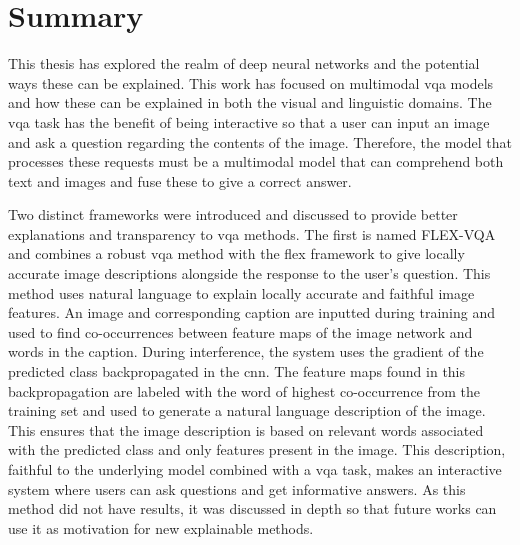 \section{Summary}
\label{sec:5_1_summary}
\begin{comment}
    Briefly summarize what you have done more or less in a step-by-step manner.
    
    Here you summarize and conclude the thesis, and it contains a lot of repetitions from previous chapters. Often, it has been structured in the following three sections, but sometimes they are also merged (especially the first two).
\end{comment}

This thesis has explored the realm of deep neural networks and the potential ways these can be explained. 
This work has focused on multimodal \gls{vqa} models and how these can be explained in both the visual and linguistic domains.
The \gls{vqa} task has the benefit of being interactive so that a user can input an image and ask a question regarding the contents of the image. Therefore, the model that processes these requests must be a multimodal model that can comprehend both text and images and fuse these to give a correct answer. 


    Two distinct frameworks were introduced and discussed to provide better explanations and transparency to \gls{vqa} methods.
    The first is named FLEX-VQA and combines a robust \gls{vqa} method with the \gls{flex} framework to give locally accurate image descriptions alongside the response to the user's question. 
    This method uses natural language to explain locally accurate and faithful image features.
    An image and corresponding caption are inputted during training and used to find co-occurrences between feature maps of the image network and words in the caption. 
    During interference, the system uses the gradient of the predicted class backpropagated in the \gls{cnn}. The feature maps found in this backpropagation are labeled with the word of highest co-occurrence from the training set and used to generate a natural language description of the image. This ensures that the image description is based on relevant words associated with the predicted class and only features present in the image. This description, faithful to the underlying model combined with a \gls{vqa} task, makes an interactive system where users can ask questions and get informative answers. 
    As this method did not have results, it was discussed in depth so that future works can use it as motivation for new explainable methods.


